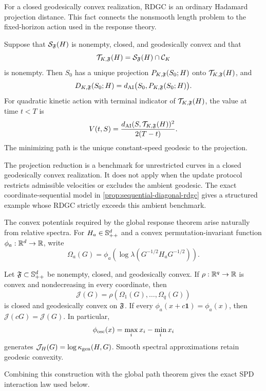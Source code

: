 For a closed geodesically convex realization, RDGC is an ordinary Hadamard
projection distance.  This fact connects the nonsmooth length problem to the
fixed-horizon action used in the response theory.

\begin{proposition}
\label{prop:rdgc-target-projection}
Suppose that \(\mathcal S_\mathfrak F(H)\) is nonempty, closed, and geodesically
convex and that
\[
  \mathcal T_{K,\mathfrak F}(H)
  =\mathcal S_\mathfrak F(H)\cap\mathcal C_K
\]
is nonempty.  Then \(S_0\) has a unique projection
\(P_{K,\mathfrak F}(S_0;H)\) onto \(\mathcal T_{K,\mathfrak F}(H)\), and
\[
  D_{K,\mathfrak F}(S_0;H)
  =
  d_{\mathrm{AI}}\bigl(S_0,P_{K,\mathfrak F}(S_0;H)\bigr).
\]
For quadratic kinetic action with terminal indicator of
\(\mathcal T_{K,\mathfrak F}(H)\), the value at time \(t<T\) is
\[
  V(t,S)=
  \frac{d_{\mathrm{AI}}(S,\mathcal T_{K,\mathfrak F}(H))^2}{2(T-t)}.
\]
The minimizing path is the unique constant-speed geodesic to the projection.
\end{proposition}

The projection reduction is a benchmark for unrestricted curves in a closed
geodesically convex realization.  It does not apply when the update protocol
restricts admissible velocities or excludes the ambient geodesic.  The exact
coordinate-sequential model in \cref{prop:sequential-diagonal-rdgc} gives a
structured example whose RDGC strictly exceeds this ambient benchmark.

The convex potentials required by the global response theorem arise
naturally from relative spectra.  For \(H_a\in\mathbb S_{++}^d\) and a convex
permutation-invariant function \(\phi_a:\mathbb R^d\to\mathbb R\), write
\[
  \Omega_a(G)
  =
  \phi_a\!\left(
  \log\lambda(G^{-1/2}H_aG^{-1/2})
  \right).
\]

\begin{proposition}
\label{prop:spd-spectral-convexity}
Let \(\mathfrak F\subset\mathbb S_{++}^d\) be nonempty, closed, and geodesically convex.  If
\(\rho:\mathbb R^q\to\mathbb R\) is convex and nondecreasing in every coordinate, then
\[
  \mathcal J(G)=\rho(\Omega_1(G),\ldots,\Omega_q(G))
\]
is closed and geodesically convex on \(\mathfrak F\).  If every
\(\phi_a(x+c\mathbf1)=\phi_a(x)\), then
\(\mathcal J(cG)=\mathcal J(G)\).
In particular,
\[
  \phi_{\rm osc}(x)=\max_i x_i-\min_i x_i
\]
generates \(\mathcal J_H(G)=\log\kappa_{\rm gen}(H,G)\).  Smooth spectral
approximations retain geodesic convexity.
\end{proposition}

Combining this construction with the global path theorem gives the exact SPD
interaction law used below.


